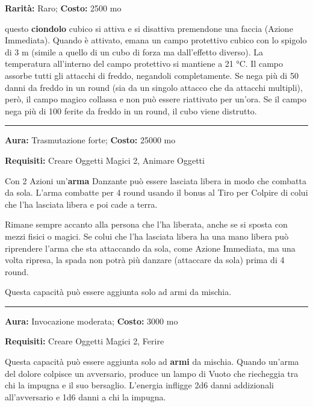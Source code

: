 \begin{multicols}{2}
\textbf{Rarità:} Raro; \textbf{Costo:} 2500 mo

questo \textbf{ciondolo} cubico si attiva e si disattiva premendone una faccia (Azione Immediata). Quando è attivato, emana un campo protettivo cubico con lo spigolo di 3 m (simile a quello di un cubo di forza ma dall'effetto diverso). La temperatura all'interno del campo protettivo si mantiene a 21 °C. Il campo assorbe tutti gli attacchi di freddo, negandoli completamente. Se nega più di 50 danni da freddo in un round (sia da un singolo attacco che da attacchi multipli), però, il campo magico collassa e non può essere riattivato per un'ora. Se il campo nega più di 100 ferite da freddo in un round, il cubo viene distrutto.

\smallskip\noindent\rule{\linewidth}{2pt}  \hypertarget{Danzante}{}\medskip{}\noindent\label{Danzante}

\textbf{Aura:} Trasmutazione forte; \textbf{Costo:} 25000 mo

\textbf{Requisiti:} Creare Oggetti Magici 2, Animare Oggetti

Con 2 Azioni un'\textbf{arma} Danzante può essere lasciata libera in modo che combatta da sola. L'arma combatte per 4 round usando il bonus al Tiro per Colpire di colui che l'ha lasciata libera e poi cade a terra.

Rimane sempre accanto alla persona che l'ha liberata, anche se si sposta con mezzi fisici o magici. Se colui che l'ha lasciata libera ha una mano libera può riprendere l'arma che sta attaccando da sola, come Azione Immediata, ma una volta ripresa, la spada non potrà più danzare (attaccare da sola) prima di 4 round.

Questa capacità può essere aggiunta solo ad armi da mischia.

\smallskip\noindent\rule{\linewidth}{2pt}  \hypertarget{deldolore}{}\medskip{}\noindent\label{deldolore}

\textbf{Aura:} Invocazione moderata; \textbf{Costo:} 3000 mo

\textbf{Requisiti:} Creare Oggetti Magici 2, Ferire

Questa capacità può essere aggiunta solo ad \textbf{armi} da mischia. Quando un'arma del dolore colpisce un avversario, produce un lampo di Vuoto che riecheggia tra chi la impugna e il suo bersaglio. L'energia infligge 2d6 danni addizionali all'avversario e 1d6 danni a chi la impugna.


\end{multicols}
